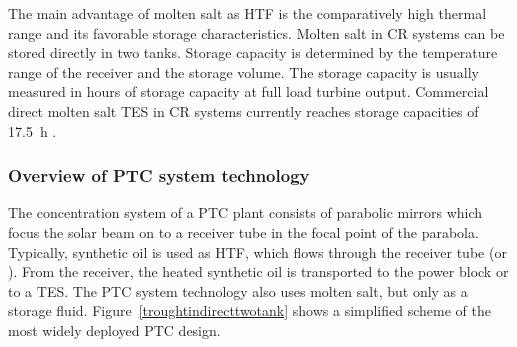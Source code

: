 The main advantage of molten salt as \ac{HTF} is the comparatively high thermal range and its favorable storage characteristics. Molten salt in \ac{CR} systems can be stored directly in two tanks. Storage capacity is determined by the temperature range of the receiver and the storage volume. The storage capacity is usually measured in hours of storage capacity at full load turbine output. Commercial direct molten salt \ac{TES} in \ac{CR} systems currently reaches storage capacities of \SI{17.5}{\hour} \cite{NREL2015b}.

\subsubsection{Overview of PTC system technology} 
The concentration system of a \ac{PTC} plant consists of parabolic mirrors which focus the solar beam on to a receiver tube in the focal point of the parabola. Typically, synthetic oil is used as \ac{HTF}, which flows through the receiver tube (or ). From the receiver, the heated synthetic oil is transported to the power block or to a \ac{TES}. The \ac{PTC} system technology also uses molten salt, but only as a storage fluid. Figure~\ref{troughtindirecttwotank} shows a simplified scheme of the most widely deployed \ac{PTC} design.

